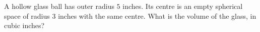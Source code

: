 A hollow glass ball has outer radius $5$ inches. Its centre is an empty spherical space of radius $3$ inches with the same centre. What is the volume of the glass, in cubic inches?
